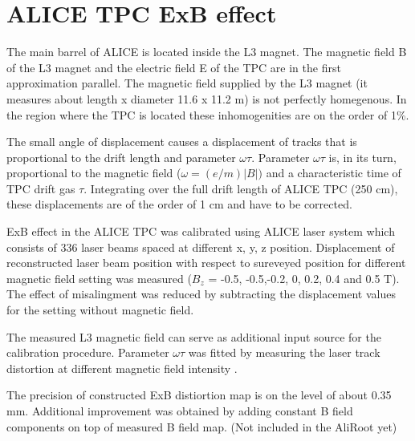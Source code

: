 \documentclass{elsart}
\begin{document}
\section{ALICE TPC  ExB effect}

The main barrel of ALICE is located inside the L3 magnet.
The magnetic field B of the L3 magnet and the electric field E of the TPC are in the 
first approximation parallel.  The magnetic field supplied by the L3 magnet (it
 measures about length x diameter 11.6 x 11.2 m) is not perfectly homegenous.
In the region where the TPC is located these inhomogenities are on the order of 1\%.

The small angle of displacement causes a displacement of tracks that is 
proportional to the drift length and parameter $\omega\tau$.
Parameter  $\omega\tau$ is, in its turn, proportional to the magnetic field ($\omega=(e/m)|B|)$ 
and a characteristic time of TPC drift gas $\tau$. Integrating over the full 
drift length of ALICE TPC (250 cm), these displacements are of the order of 1 
cm and have to be corrected.

ExB effect in the ALICE TPC was calibrated using ALICE laser system which consists of 336 laser beams spaced at different x, y, z position. Displacement of  reconstructed laser beam position with respect to sureveyed position for different magnetic field setting was measured ($B_z$ = -0.5, -0.5,-0.2, 0, 0.2, 0.4 and 0.5 T). The effect of misalingment was reduced by subtracting the displacement values for the setting without magnetic field.

The measured L3 magnetic field can serve as additional input source for the calibration procedure.
Parameter $\omega\tau$ was fitted by measuring the laser track distortion at different magnetic field intensity . 

The precision of constructed ExB distiortion map is on the level of about 0.35 mm. Additional improvement was obtained by adding constant B field components on top of measured B field map. (Not included in the AliRoot yet)  
\end{document}
